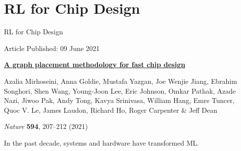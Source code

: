 \section{RL for Chip Design}


\begin{frame}{RL for Chip Design}
\vfill
\begin{center}
{\footnotesize Article \quad\textbar\quad Published: 09 June 2021}

\vspace{0.6em}
{\LARGE\bfseries \href{https://www.nature.com/articles/s41586-021-03544-w}{A graph placement methodology for fast chip design}}

\vspace{0.8em}
{\footnotesize Azalia Mirhoseini, Anna Goldie, Mustafa Yazgan, Joe Wenjie Jiang,
Ebrahim Songhori, Shen Wang, Young-Joon Lee, Eric Johnson, Omkar Pathak,
Azade Nazi, Jiwoo Pak, Andy Tong, Kavya Srinivasa, William Hang, Emre Tuncer,
Quoc V. Le, James Laudon, Richard Ho, Roger Carpenter \& Jeff Dean}

\vspace{0.8em}
{\footnotesize \textit{Nature} \textbf{594}, 207--212 (2021)}
\end{center}
\vfill
\end{frame}

\begin{frame}{In the past decade, systems and hardware have transformed ML.}
\vfill
\begin{center}
\end{center}
\vfill
\end{frame}


